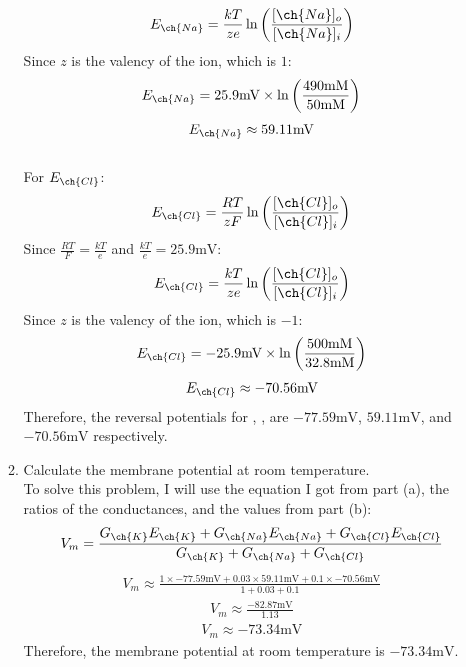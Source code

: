 \documentclass[11pt]{article}
\begin{document}
\begin{enumerate}[label=\arabic*.]
\begin{enumerate}[label=\alph*.]
\begin{align*}
E_{\ch{Na}} = \frac{k T} {ze} \ln{\left(\frac{[\ch{Na}]_o} {[\ch{Na}]_i}\right)}
\end{align*}
Since $z$ is the valency of the  ion, which is $1$:
\begin{align*}
E_{\ch{Na}} = 25.9 \text{mV} \times \ln{\left(\frac{490 \text{mM}} {50 \text{mM}}\right)}
\end{align*}
\begin{align*}
E_{\ch{Na}} \approx 59.11 \text{mV}
\end{align*}
\vspace*{1\baselineskip}
\\
For $E_{\ch{Cl}}$:
\begin{align*}
E_{\ch{Cl}} = \frac{R T} {z F} \ln{\left(\frac{[\ch{Cl}]_o} {[\ch{Cl}]_i}\right)}
\end{align*}
Since $\frac{R T} {F} = \frac{k T} {e}$ and $\frac{k T} {e} = 25.9 \text{mV}$:
\begin{align*}
E_{\ch{Cl}} = \frac{k T} {ze} \ln{\left(\frac{[\ch{Cl}]_o} {[\ch{Cl}]_i}\right)}
\end{align*}
Since $z$ is the valency of the  ion, which is $-1$:
\begin{align*}
E_{\ch{Cl}} = -25.9 \text{mV} \times \ln{\left(\frac{500 \text{mM}} {32.8 \text{mM}}\right)}
\end{align*}
\begin{align*}
E_{\ch{Cl}} \approx -70.56 \text{mV}
\end{align*}
Therefore, the reversal potentials for , ,  are $-77.59 \text{mV}$, $59.11 \text{mV}$, and $-70.56 \text{mV}$ respectively.



\newpage
\item
Calculate the membrane potential at room temperature.
\vspace*{1\baselineskip}
\\
To solve this problem, I will use the equation I got from part (a), the ratios of the conductances, and the values from part (b):
\begin{align*}
V_m = \frac{G_{\ch{K}} E_{\ch{K}} + G_{\ch{Na}} E_{\ch{Na}} + G_{\ch{Cl}} E_{\ch{Cl}}} {G_{\ch{K}} + G_{\ch{Na}} + G_{\ch{Cl}}}
\end{align*}
\begin{align*}
V_m \approx \frac{1 \times -77.59 \text{mV} + 0.03 \times 59.11 \text{mV} + 0.1 \times -70.56 \text{mV}} {1 + 0.03 + 0.1}
\end{align*}
\begin{align*}
V_m \approx \frac{-82.87 \text{mV}} {1.13}
\end{align*}
\begin{align*}
V_m \approx -73.34 \text{mV}
\end{align*}
Therefore, the membrane potential at room temperature is $-73.34 \text{mV}$.




\end{enumerate}
\end{enumerate}
\end{document}
